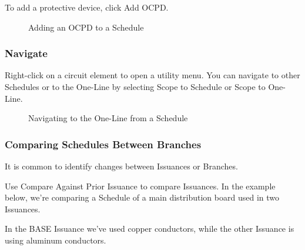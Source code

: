 \documentclass[letterpaper,10pt,english]{sphinxmanual}
\begin{document}
To add a protective device, click Add OCPD.

\begin{figure}[H]
\centering
\capstart

\noindent{}
\caption{Adding an OCPD to a Schedule}\label{\detokenize{docs/userguide/buildingelectricalmodel/schedules/index-schedules:id15}}\end{figure}

\ignorespaces 

\subsubsection{Navigate}
\label{\detokenize{docs/userguide/buildingelectricalmodel/schedules/index-schedules:navigate}}\label{\detokenize{docs/userguide/buildingelectricalmodel/schedules/index-schedules:scope-to-one-line}}\label{\detokenize{docs/userguide/buildingelectricalmodel/schedules/index-schedules:index-6}}
Right-click on a circuit element to open a utility menu.  You can navigate to other Schedules or to the One-Line by selecting Scope to Schedule or Scope to One-Line.

\begin{figure}[H]
\centering
\capstart

\noindent{}
\caption{Navigating to the One-Line from a Schedule}\label{\detokenize{docs/userguide/buildingelectricalmodel/schedules/index-schedules:id16}}\end{figure}


\subsubsection{Comparing Schedules Between Branches}
\label{\detokenize{docs/userguide/buildingelectricalmodel/schedules/index-schedules:comparing-schedules-between-branches}}
It is common to identify changes between Issuances or Branches.

Use Compare Against Prior Issuance to compare Issuances.  In the example below, we’re comparing a Schedule of a main distribution board used in two Issuances.

In the BASE Issuance we’ve used copper conductors, while the other Issuance is using aluminum conductors.
\end{document}
